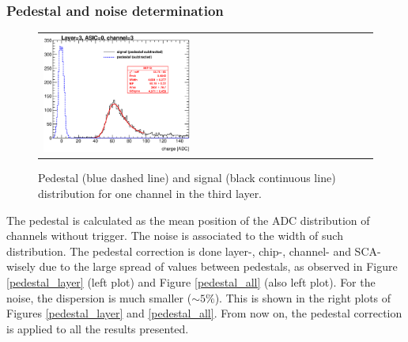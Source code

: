 \documentclass[final,3p,times,twocolumn]{elsarticle}
\begin{document}
\subsubsection{Pedestal and noise determination}
\label{sec:pedestal}


\begin{figure}[!t]
  \centering
  \begin{tabular}{l}
    \includegraphics[width=0.45\textwidth]{../figs/mip_pedestal_example.eps}
  \end{tabular}
  \caption{Pedestal (blue dashed line) and signal (black continuous line) distribution for one channel in the third layer.}
\label{signal_pedestal}
\end{figure}

The pedestal is calculated as the mean position of
the ADC distribution of channels without trigger. The noise is
associated to the width of such distribution.
The pedestal correction is done layer-, chip-, channel- and SCA-wisely due to the large spread of values between pedestals, as observed in 
Figure \ref{pedestal_layer} (left plot) and Figure \ref{pedestal_all} (also left plot).
For the noise, the dispersion is much smaller ($\sim 5 \%$). This is shown in the right plots of Figures \ref{pedestal_layer} and \ref{pedestal_all}.
From now on, the pedestal correction is applied to all the results presented.
\end{document}
